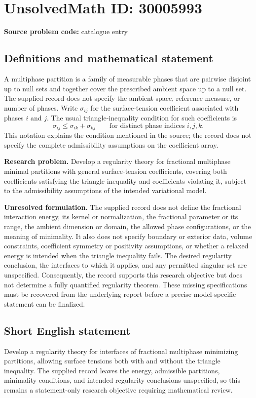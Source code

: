 \documentclass[11pt]{article}
\begin{document}
\section*{UnsolvedMath ID: 30005993}
\textbf{Source problem code:} catalogue entry
\subsection{Definitions and mathematical statement}
A multiphase partition is a family of measurable phases that are pairwise disjoint up to null sets and together cover the prescribed ambient space up to a null set. The supplied record does not specify the ambient space, reference measure, or number of phases. Write \(\sigma_{ij}\) for the surface-tension coefficient associated with phases \(i\) and \(j\). The usual triangle-inequality condition for such coefficients is
\[
\sigma_{ij}\leq \sigma_{ik}+\sigma_{kj}
\qquad\text{for distinct phase indices }i,j,k.
\]
This notation explains the condition mentioned in the source; the record does not specify the complete admissibility assumptions on the coefficient array.

\textbf{Research problem.} Develop a regularity theory for fractional multiphase minimal partitions with general surface-tension coefficients, covering both coefficients satisfying the triangle inequality and coefficients violating it, subject to the admissibility assumptions of the intended variational model.

\textbf{Unresolved formulation.} The supplied record does not define the fractional interaction energy, its kernel or normalization, the fractional parameter or its range, the ambient dimension or domain, the allowed phase configurations, or the meaning of minimality. It also does not specify boundary or exterior data, volume constraints, coefficient symmetry or positivity assumptions, or whether a relaxed energy is intended when the triangle inequality fails. The desired regularity conclusion, the interfaces to which it applies, and any permitted singular set are unspecified. Consequently, the record supports this research objective but does not determine a fully quantified regularity theorem. These missing specifications must be recovered from the underlying report before a precise model-specific statement can be finalized.
\subsection{Short English statement}
Develop a regularity theory for interfaces of fractional multiphase minimizing partitions, allowing surface tensions both with and without the triangle inequality. The supplied record leaves the energy, admissible partitions, minimality conditions, and intended regularity conclusions unspecified, so this remains a statement-only research objective requiring mathematical review.
\end{document}
